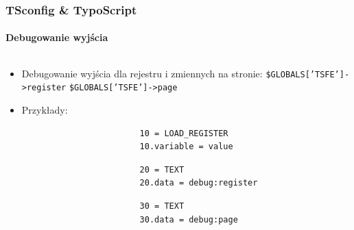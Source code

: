 \begin{frame}[fragile]
	\frametitle{TSconfig \& TypoScript}
	\framesubtitle{Debugowanie wyjścia}

	\begin{columns}[T]

		\begin{column}{.6\textwidth}
			\begin{itemize}
				\item Debugowanie wyjścia dla rejestru i zmiennych na stronie:\newline
					\texttt{\$GLOBALS['TSFE']->register}\newline
					\texttt{\$GLOBALS['TSFE']->page}

				\item Przykłady:

					\begin{lstlisting}
						10 = LOAD_REGISTER
						10.variable = value
					\end{lstlisting}

					\begin{lstlisting}
						20 = TEXT
						20.data = debug:register
					\end{lstlisting}

					\begin{lstlisting}
						30 = TEXT
						30.data = debug:page
					\end{lstlisting}

			\end{itemize}
		\end{column}


\end{columns}
\end{frame}
